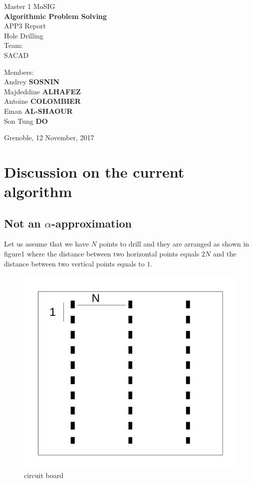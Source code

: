\documentclass{article}
\begin{document}
\begin{titlepage}
\begin{center}

\vspace*{10cm}
{\large Master 1 MoSIG}\\[0.5cm]

{\Huge \textbf{Algorithmic Problem Solving} }\\[0.5cm]
{\large APP3 Report}\\
Hole Drilling\\ 
Team:\\SACAD
\vfill

\noindent
\begin{minipage}{0.4\textwidth}
   \centering Members:\\
   Andrey \textbf{SOSNIN}\\
   Majdeddine \textbf{ALHAFEZ}\\
   Antoine \textbf{COLOMBIER}\\
   Eman \textbf{AL-SHAOUR}\\
   Son Tung \textbf{DO}\\
\end{minipage}%

\vfill
{Grenoble, 12 November, 2017}
\end{center}
\end{titlepage}
\clearpage

\section{Discussion on the current algorithm}


\subsection{Not an $\alpha$-approximation}
Let us assume that we have $N$ points to drill and they are arranged as shown in figure1 where the distance between two horizontal points equals $2N$ and the distance between two vertical points equals to $1$.

\begin{figure}[h]
\centering \includegraphics[width=0.3\linewidth]{F0.jpg}
\caption{circuit board}
\end{figure}
\end{document}
